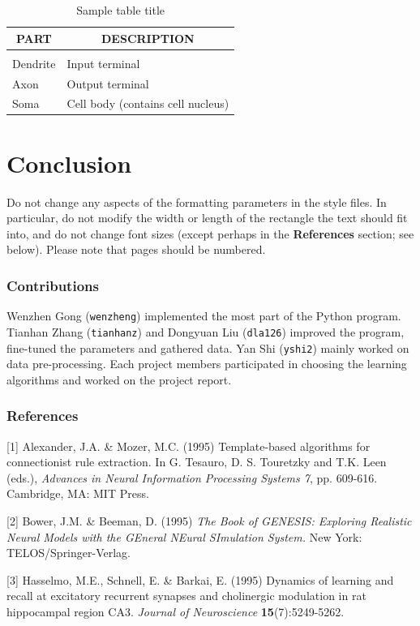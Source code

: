 \documentclass{article} %
\begin{document}
\begin{table}[t]
\caption{Sample table title}
\label{sample-table}
\begin{center}
\begin{tabular}{ll}
\multicolumn{1}{c}{\bf PART}  &\multicolumn{1}{c}{\bf DESCRIPTION}
\\ \hline \\
Dendrite         &Input terminal \\
Axon             &Output terminal \\
Soma             &Cell body (contains cell nucleus) \\
\end{tabular}
\end{center}
\end{table}

\section{Conclusion}

Do not change any aspects of the formatting parameters in the style files.
In particular, do not modify the width or length of the rectangle the text
should fit into, and do not change font sizes (except perhaps in the
\textbf{References} section; see below). Please note that pages should be
numbered.

\subsubsection*{Contributions}

Wenzhen Gong (\texttt{wenzheng}) implemented the most part of the Python program. Tianhan Zhang (\texttt{tianhanz}) and Dongyuan Liu (\texttt{dla126}) improved the program, fine-tuned the parameters and gathered data. Yan Shi (\texttt{yshi2}) mainly worked on data pre-processing. Each project members participated in choosing the learning algorithms and worked on the project report.

\subsubsection*{References}

\small{
[1] Alexander, J.A. \& Mozer, M.C. (1995) Template-based algorithms
for connectionist rule extraction. In G. Tesauro, D. S. Touretzky
and T.K. Leen (eds.), {\it Advances in Neural Information Processing
Systems 7}, pp. 609-616. Cambridge, MA: MIT Press.

[2] Bower, J.M. \& Beeman, D. (1995) {\it The Book of GENESIS: Exploring
Realistic Neural Models with the GEneral NEural SImulation System.}
New York: TELOS/Springer-Verlag.

[3] Hasselmo, M.E., Schnell, E. \& Barkai, E. (1995) Dynamics of learning
and recall at excitatory recurrent synapses and cholinergic modulation
in rat hippocampal region CA3. {\it Journal of Neuroscience}
{\bf 15}(7):5249-5262.
}
\end{document}
